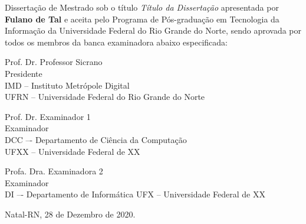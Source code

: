 \begin{folhadeaprovacao}
	
	\noindent 
	Dissertação de Mestrado sob o título \textit{Título da Dissertação} apresentada por \textbf{Fulano de Tal} e aceita pelo Programa de Pós-graduação em Tecnologia da Informação da Universidade Federal do Rio Grande do Norte, sendo aprovada por todos os membros da banca examinadora abaixo especificada:
		
	\assinatura
	{
		Prof. Dr. Professor Sicrano  			                  \\
		{\small Presidente}											          \smallskip\\ 
		{\footnotesize
			IMD -- Instituto Metrópole Digital		   \\ %
		  	UFRN -- Universidade Federal do Rio Grande do Norte %
		}
   }
      
   \assinatura
	{
		Prof. Dr. Examinador 1               \\
		{\small Examinador}											          \smallskip\\ 
		{\footnotesize
		    DCC –- Departamento de Ciência da Computação\\
			UFXX -- Universidade Federal de XX		   \\
		}
   }   
   
   \assinatura
	{
		Profa. Dra. Examinadora 2       \\
		{\small Examinador}											          \smallskip\\ 
	    {\footnotesize
			DI –- Departamento de Informática
			UFX -- Universidade Federal de XX		   \\
		}
	}
	
	\vfill
	
	\begin{center}
		Natal-RN, 28 de Dezembro de 2020.
	\end{center}
\end{folhadeaprovacao}


